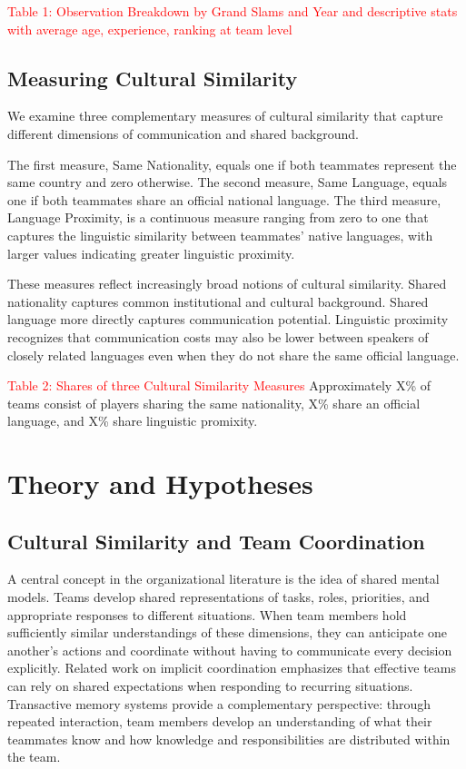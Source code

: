 \documentclass[10pt]{article}
\begin{document}
\textcolor{red}{Table 1: Observation Breakdown by Grand Slams and Year and descriptive stats with average age, experience, ranking at team level}
\subsection{Measuring Cultural Similarity}
We examine three complementary measures of cultural similarity that capture different dimensions of communication and shared background.

The first measure, Same Nationality, equals one if both teammates represent the same country and zero otherwise. The second measure, Same Language, equals one if both teammates share an official national language. The third measure, Language Proximity, is a continuous measure ranging from zero to one that captures the linguistic similarity between teammates' native languages, with larger values indicating greater linguistic proximity.

These measures reflect increasingly broad notions of cultural similarity. Shared nationality captures common institutional and cultural background. Shared language more directly captures communication potential. Linguistic proximity recognizes that communication costs may also be lower between speakers of closely related languages even when they do not share the same official language.

\textcolor{red}{Table 2: Shares of three Cultural Similarity Measures}
Approximately X\% of teams consist of players sharing the same nationality,  X\% share an official language, and X\% share linguistic promixity.
\section{Theory and Hypotheses}
\subsection{Cultural Similarity and Team Coordination}
A central concept in the organizational literature is the idea of shared mental models. Teams develop shared representations of tasks, roles, priorities, and appropriate responses to different situations. When team members hold sufficiently similar understandings of these dimensions, they can anticipate one another's actions and coordinate without having to communicate every decision explicitly. Related work on implicit coordination emphasizes that effective teams can rely on shared expectations when responding to recurring situations. Transactive memory systems provide a complementary perspective: through repeated interaction, team members develop an understanding of what their teammates know and how knowledge and responsibilities are distributed within the team.
\end{document}
